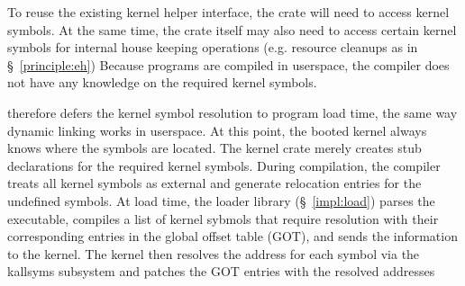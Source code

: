 To reuse the existing kernel helper interface, the crate will need to access
    kernel symbols.
At the same time, the crate itself may also need to access certain kernel
    symbols for internal house keeping operations (e.g. resource cleanups as in
    \S~\ref{principle:eh})
Because \projname{} programs are compiled in userspace, the compiler does not
    have any knowledge on the required kernel symbols.

\projname{} therefore defers the kernel symbol resolution to program load time,
    the same way dynamic linking works in userspace.
At this point, the booted kernel always knows where the symbols are located.
The \projname{} kernel crate merely creates stub declarations for the required
    kernel symbols.
During compilation, the compiler treats all kernel symbols as external and
    generate relocation entries for the undefined symbols.
At load time, the loader library (\S~\ref{impl:load}) parses the executable,
    compiles a list of kernel sybmols that require resolution with their
    corresponding entries in the global offset table (GOT), and sends the
    information to the kernel.
The kernel then resolves the address for each symbol via the kallsyms subsystem
    and patches the GOT entries with the resolved addresses

